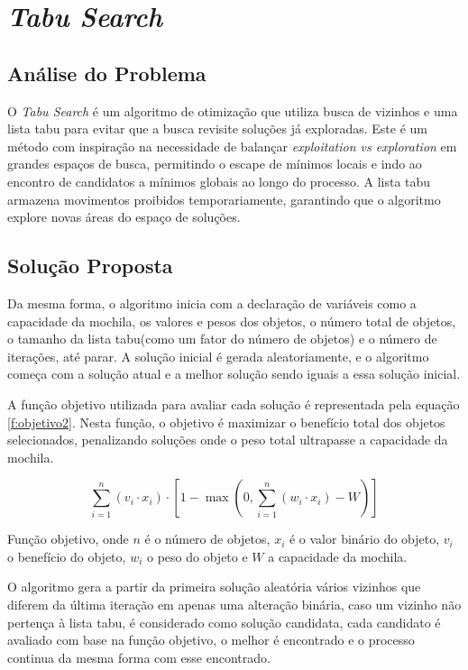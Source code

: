 \section{\textit{Tabu Search} }

\subsection{Análise do Problema}

O \textit{Tabu Search}\cite{Tabu} é um algoritmo de otimização que utiliza busca de vizinhos e uma lista tabu para evitar que a busca revisite soluções já exploradas. Este é um método com inspiração na necessidade de balançar \textit{exploitation vs exploration} em grandes espaços de busca, permitindo o escape de mínimos locais e indo ao encontro de candidatos a mínimos globais ao longo do processo. A lista tabu armazena movimentos proibidos temporariamente, garantindo que o algoritmo explore novas áreas do espaço de soluções.

\subsection{Solução Proposta}

Da mesma forma, o algoritmo inicia com a declaração de variáveis como a capacidade da mochila, os valores e pesos dos objetos, o número total de objetos, o tamanho da lista tabu(como um fator do número de objetos) e o número de iterações, até parar. A solução inicial é gerada aleatoriamente, e o algoritmo começa com a solução atual e a melhor solução sendo iguais a essa solução inicial.

A função objetivo utilizada para avaliar cada solução é representada pela equação \ref{f:objetivo2}. Nesta função, o objetivo é maximizar o benefício total dos objetos selecionados, penalizando soluções onde o peso total ultrapasse a capacidade da mochila.

\begin{mycapequ}[!ht]
\begin{equation}
\label{f:objetivo2}
    \sum_{i=1}^{n} (v_i \cdot x_i) \cdot \left[1 - \max\left(0, \sum_{i=1}^{n} (w_i \cdot x_i) - W\right)\right]
\end{equation}
\caption{Função objetivo, onde $n$ é o número de objetos, $x_i$ é o valor binário do objeto, $v_i$ o benefício do objeto, $w_i$ o peso do objeto e $W$ a capacidade da mochila.}
\end{mycapequ}

O algoritmo gera a partir da primeira solução aleatória vários vizinhos que diferem da última iteração em apenas uma alteração binária, caso um vizinho não pertença à lista tabu, é considerado como solução candidata, cada candidato é avaliado com base na função objetivo, o melhor é encontrado e o processo continua da mesma forma com esse encontrado.

